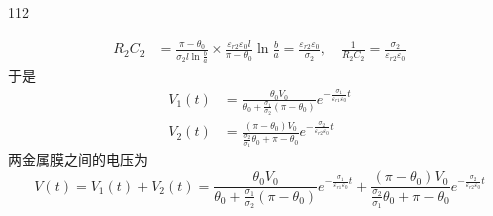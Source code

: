 \begin{solution}{112}
\begin{subsolution}
\begin{align}
            R_{2} C_{2} &= \frac{\pi - \theta_{0}}{\sigma_{2} l \ln \frac{b}{a}} \times \frac{\varepsilon_{r2} \varepsilon_{0} l}{\pi - \theta_{0}} \ln \frac{b}{a} = \frac{\varepsilon_{r2} \varepsilon_{0}}{\sigma_{2}}, \quad \frac{1}{R_{2} C_{2}} = \frac{\sigma_{2}}{\varepsilon_{r2} \varepsilon_{0}} \label{eq:21.s112}
        \end{align}
        于是
        \begin{align}
            V_{1}(t) &= \frac{\theta_{0} V_{0}}{\theta_{0} + \frac{\sigma_{1}}{\sigma_{2}} (\pi - \theta_{0})} e^{- \frac{\sigma_{1}}{\varepsilon_{r1} \varepsilon_{0}} t} \label{eq:22.s112} \\
            V_{2}(t) &= \frac{(\pi - \theta_{0}) V_{0}}{\frac{\sigma_{2}}{\sigma_{1}} \theta_{0} + \pi - \theta_{0}} e^{- \frac{\sigma_{2}}{\varepsilon_{r2} \varepsilon_{0}} t} \label{eq:23.s112}
        \end{align}
        两金属膜之间的电压为
        \begin{equation}
            V(t) = V_{1}(t) + V_{2}(t) = \frac{\theta_{0} V_{0}}{\theta_{0} + \frac{\sigma_{1}}{\sigma_{2}} (\pi - \theta_{0})} e^{- \frac{\sigma_{1}}{\varepsilon_{r1} \varepsilon_{0}} t} + \frac{(\pi - \theta_{0}) V_{0}}{\frac{\sigma_{2}}{\sigma_{1}} \theta_{0} + \pi - \theta_{0}} e^{- \frac{\sigma_{2}}{\varepsilon_{r2} \varepsilon_{0}} t}
            \label{eq:24.s112}
        \end{equation}
    \end{subsolution}
\end{solution}